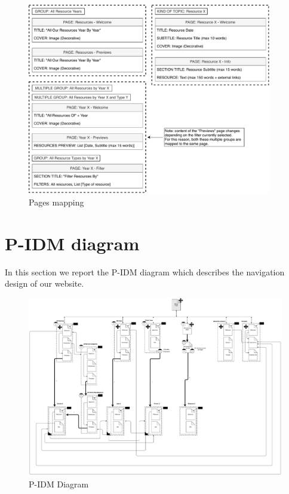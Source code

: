\documentclass[12pt]{report}
\begin{document}
\begin{figure}[h]
	\centering
	\includegraphics[width=0.95\textwidth]{page_mapping_pt3.pdf}
	\caption{Pages mapping}
\end{figure}

\chapter{P-IDM diagram}
In this section we report the P-IDM diagram which describes the navigation design of our website.\\
\begin{figure}[h]
	\centering
	\includegraphics[width=\textwidth]{P-IDM.pdf}
	\caption{P-IDM Diagram}
\end{figure}
\end{document}
